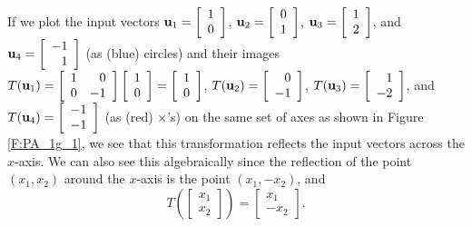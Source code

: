 If we plot the input vectors $\mathbf{u}_1 = \left[ \begin{array}{c}  1 \\ 0 \end{array} \right]$, $\mathbf{u}_2 = \left[ \begin{array}{c}  0\\1 \end{array} \right]$, $\mathbf{u}_3 = \left[ \begin{array}{c} 1  \\ 2 \end{array} \right]$, and  $\mathbf{u}_4 = \left[ \begin{array}{r} -1  \\ 1 \end{array} \right]$ (as (blue) circles) and their images $T(\mathbf{u}_1) = \left[ \begin{array}{cr} 1&0 \\ 0&-1 \end{array} \right]\left[ \begin{array}{c} 1 \\ 0 \end{array} \right] = \left[ \begin{array}{c} 1 \\ 0 \end{array} \right]$, $T(\mathbf{u}_2) = \left[ \begin{array}{r} 0 \\ -1 \end{array} \right]$, $T(\mathbf{u}_3) = \left[ \begin{array}{r} 1 \\ -2 \end{array} \right]$, and $T(\mathbf{u}_4) = \left[ \begin{array}{r} -1 \\ -1 \end{array} \right]$ (as (red) $\times$'s) on the same set of axes as shown in Figure \ref{F:PA_1g_1}, we see that this transformation reflects the input vectors across the $x$-axis. We can also see this algebraically since the reflection of the point $(x_1,x_2)$ around the $x$-axis is the point $(x_1,-x_2)$, and 
\[T\left( \left[ \begin{array}{c} x_1 \\ x_2 \end{array} \right] \right) = \left[ \begin{array}{r} x_1 \\ -x_2 \end{array} \right].\]

